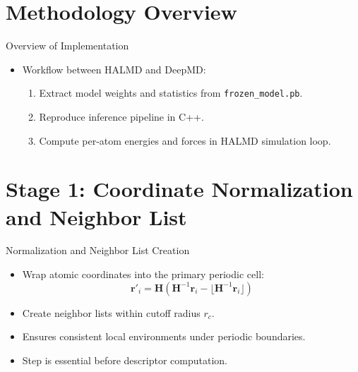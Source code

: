 \documentclass[aspectratio=169]{beamer}
\begin{document}
\section{Methodology Overview}

\begin{frame}{Overview of Implementation}
\begin{center}
\end{center}
\begin{itemize}
    \item Workflow between HALMD and DeepMD:
    \begin{enumerate}
        \item Extract model weights and statistics from \texttt{frozen\_model.pb}.
        \item Reproduce inference pipeline in C++.
        \item Compute per-atom energies and forces in HALMD simulation loop.
    \end{enumerate}
\end{itemize}
\end{frame}

\section{Stage 1: Coordinate Normalization and Neighbor List}

\begin{frame}{Normalization and Neighbor List Creation}
\begin{itemize}
    \item Wrap atomic coordinates into the primary periodic cell:
    \[
    \mathbf{r}'_i = \mathbf{H}(\mathbf{H}^{-1}\mathbf{r}_i - \lfloor \mathbf{H}^{-1}\mathbf{r}_i \rfloor)
    \]
    \item Create neighbor lists within cutoff radius $r_c$.
    \item Ensures consistent local environments under periodic boundaries.
    \item Step is essential before descriptor computation.
\end{itemize}
\begin{center}
\end{center}
\end{frame}

\end{document}
